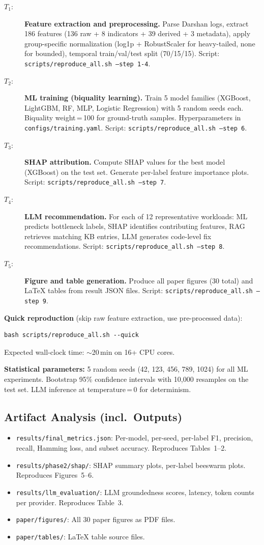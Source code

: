 \documentclass[conference]{IEEEtran}
\newcommand{\artout}{\subsection*{Artifact Analysis (incl.\ Outputs)}}
\begin{document}
\begin{description}
\item[$T_1$:] \textbf{Feature extraction and preprocessing.}
Parse Darshan logs, extract 186 features (136 raw + 8 indicators +
39 derived + 3 metadata), apply group-specific normalization (log1p +
RobustScaler for heavy-tailed, none for bounded), temporal
train/val/test split (70/15/15).
Script: \texttt{scripts/reproduce\_all.sh --step 1-4}.
\item[$T_2$:] \textbf{ML training (biquality learning).}
Train 5 model families (XGBoost, LightGBM, RF, MLP, Logistic Regression)
with 5 random seeds each. Biquality weight\,=\,100 for ground-truth
samples. Hyperparameters in \texttt{configs/training.yaml}.
Script: \texttt{scripts/reproduce\_all.sh --step 6}.
\item[$T_3$:] \textbf{SHAP attribution.}
Compute SHAP values for the best model (XGBoost) on the test set.
Generate per-label feature importance plots.
Script: \texttt{scripts/reproduce\_all.sh --step 7}.
\item[$T_4$:] \textbf{LLM recommendation.}
For each of 12 representative workloads: ML predicts bottleneck labels,
SHAP identifies contributing features, RAG retrieves matching KB entries,
LLM generates code-level fix recommendations.
Script: \texttt{scripts/reproduce\_all.sh --step 8}.
\item[$T_5$:] \textbf{Figure and table generation.}
Produce all paper figures (30 total) and LaTeX tables from result JSON
files.
Script: \texttt{scripts/reproduce\_all.sh --step 9}.
\end{description}

\textbf{Quick reproduction} (skip raw feature extraction, use
pre-processed data):
\begin{verbatim}
bash scripts/reproduce_all.sh --quick
\end{verbatim}
Expected wall-clock time: $\sim$20\,min on 16+ CPU cores.

\textbf{Statistical parameters:}
5 random seeds (42, 123, 456, 789, 1024) for all ML experiments.
Bootstrap 95\% confidence intervals with 10{,}000 resamples on the
test set. LLM inference at temperature\,=\,0 for determinism.

\artout
\begin{itemize}
\item \texttt{results/final\_metrics.json}: Per-model, per-seed, per-label
F1, precision, recall, Hamming loss, and subset accuracy. Reproduces
Tables~1--2.
\item \texttt{results/phase2/shap/}: SHAP summary plots, per-label
beeswarm plots. Reproduces Figures~5--6.
\item \texttt{results/llm\_evaluation/}: LLM groundedness scores,
latency, token counts per provider. Reproduces Table~3.
\item \texttt{paper/figures/}: All 30 paper figures as PDF files.
\item \texttt{paper/tables/}: LaTeX table source files.
\end{itemize}
\end{document}
